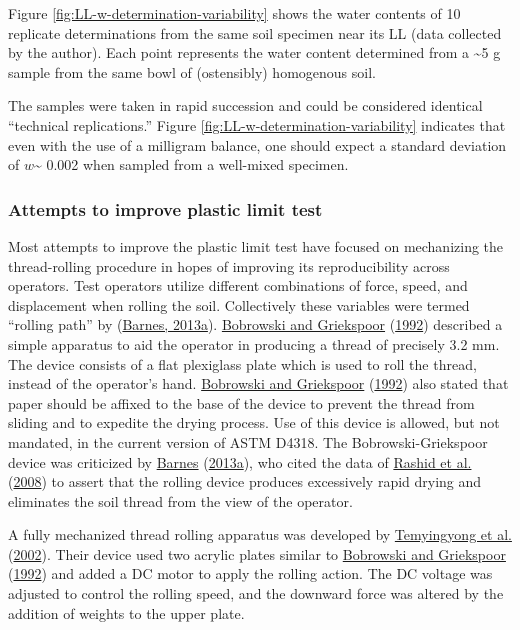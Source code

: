 \documentclass[
  letterpaper,
  openany]{book}
\begin{document}
Figure \ref{fig:LL-w-determination-variability} shows the water contents of 10 replicate determinations from the same soil specimen near its LL (data collected by the author).
Each point represents the water content determined from a \textasciitilde5 g sample from the same bowl of (ostensibly) homogenous soil.

The samples were taken in rapid succession and could be considered identical ``technical replications.''
Figure \ref{fig:LL-w-determination-variability} indicates that even with the use of a milligram balance, one should expect a standard deviation of \(w\)\textasciitilde{} 0.002 when sampled from a well-mixed specimen.

\hypertarget{plastic-limit-test-improvement-attempts}{%
\subsubsection{Attempts to improve plastic limit test}\label{plastic-limit-test-improvement-attempts}}

Most attempts to improve the plastic limit test have focused on mechanizing the thread-rolling procedure in hopes of improving its reproducibility across operators.
Test operators utilize different combinations of force, speed, and displacement when rolling the soil. Collectively these variables were termed ``rolling path'' by (\protect\hyperlink{ref-Barnes2013}{Barnes, 2013a}).
\protect\hyperlink{ref-Bobrowski1992}{Bobrowski and Griekspoor} (\protect\hyperlink{ref-Bobrowski1992}{1992}) described a simple apparatus to aid the operator in producing a thread of precisely 3.2 mm.
The device consists of a flat plexiglass plate which is used to roll the thread, instead of the operator's hand. \protect\hyperlink{ref-Bobrowski1992}{Bobrowski and Griekspoor} (\protect\hyperlink{ref-Bobrowski1992}{1992}) also stated that paper should be affixed to the base of the device to prevent the thread from sliding and to expedite the drying process.
Use of this device is allowed, but not mandated, in the current version of ASTM D4318.
The Bobrowski-Griekspoor device was criticized by \protect\hyperlink{ref-Barnes2013}{Barnes} (\protect\hyperlink{ref-Barnes2013}{2013a}), who cited the data of \protect\hyperlink{ref-Rashid2008}{Rashid et al.} (\protect\hyperlink{ref-Rashid2008}{2008}) to assert that the rolling device produces excessively rapid drying and eliminates the soil thread from the view of the operator.

A fully mechanized thread rolling apparatus was developed by \protect\hyperlink{ref-Temyingyong2002}{Temyingyong et al.} (\protect\hyperlink{ref-Temyingyong2002}{2002}). Their device used two acrylic plates similar to \protect\hyperlink{ref-Bobrowski1992}{Bobrowski and Griekspoor} (\protect\hyperlink{ref-Bobrowski1992}{1992}) and added a DC motor to apply the rolling action.
The DC voltage was adjusted to control the rolling speed, and the downward force was altered by the addition of weights to the upper plate.
\end{document}
